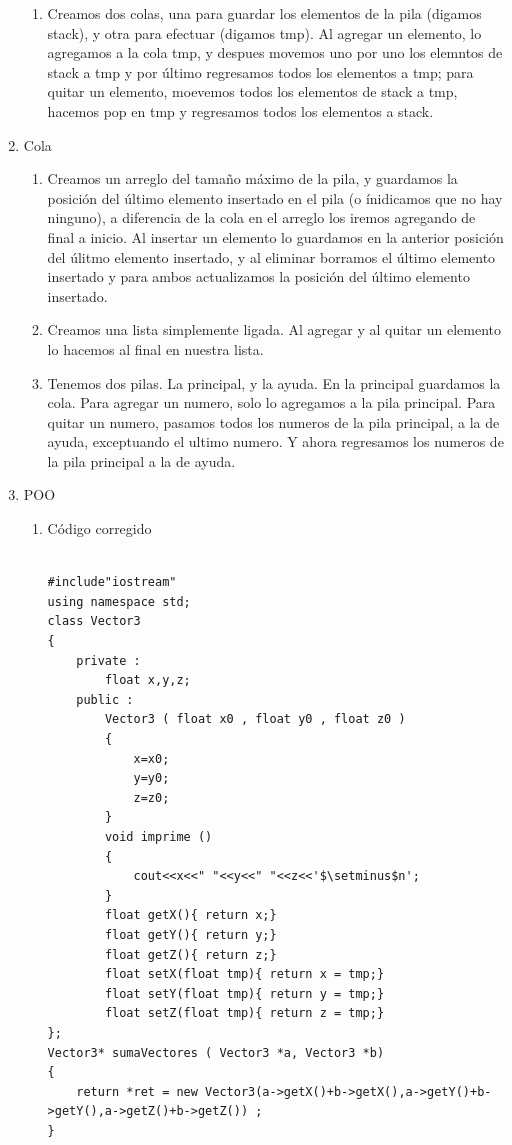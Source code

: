 \documentclass[letterpaper]{article}
\theoremstyle{definition}
\theoremstyle{lemathm}
\theoremstyle{lemademthm}
\begin{document}
\begin{enumerate}
\begin{enumerate}
			\item Creamos dos colas, una para guardar los elementos de la pila (digamos stack), y otra para efectuar (digamos tmp). Al agregar un elemento, lo agregamos a la cola tmp, y despues movemos uno por uno los elemntos de stack a tmp y por último regresamos todos los elementos a tmp; para quitar un elemento, moevemos todos los elementos de stack a tmp, hacemos pop en tmp y regresamos todos los elementos a stack.
		\end{enumerate}
		\newpage
		\item Cola
		\begin{enumerate}
			\item Creamos un arreglo del tamaño máximo de la pila, y guardamos la posición del último elemento insertado en el pila (o ínidicamos que no hay ninguno), a diferencia de la cola en el arreglo los iremos agregando de final a inicio. Al insertar un elemento lo guardamos en la anterior posición del úlitmo elemento insertado, y al eliminar borramos el último elemento insertado y para ambos actualizamos la posición del último elemento insertado.
			\item Creamos una lista simplemente ligada. Al agregar y al quitar un elemento lo hacemos al final en nuestra lista.
			\item Tenemos dos pilas. La principal, y la ayuda. En la principal guardamos la cola. Para agregar un numero, solo lo agregamos a la pila principal. Para quitar un numero, pasamos todos los numeros de la pila principal, a la de ayuda, exceptuando el ultimo numero. Y ahora regresamos los numeros de la pila principal a la de ayuda.
		\end{enumerate}
		\item POO
		
		\begin{enumerate}
			\item Código corregido
			
			\begin{lstlisting}
			
#include"iostream"
using namespace std;
class Vector3
{
	private :
		float x,y,z;
	public :
		Vector3 ( float x0 , float y0 , float z0 ) 
		{
			x=x0; 
			y=y0; 
			z=z0;
		}
		void imprime () 
		{
			cout<<x<<" "<<y<<" "<<z<<'$\setminus$n';
		}
		float getX(){ return x;}
		float getY(){ return y;}
		float getZ(){ return z;}
		float setX(float tmp){ return x = tmp;}
		float setY(float tmp){ return y = tmp;}
		float setZ(float tmp){ return z = tmp;}
};
Vector3* sumaVectores ( Vector3 *a, Vector3 *b)
{
	return *ret = new Vector3(a->getX()+b->getX(),a->getY()+b->getY(),a->getZ()+b->getZ()) ;
}


\end{lstlisting}
\end{enumerate}
\end{enumerate}
\end{document}
